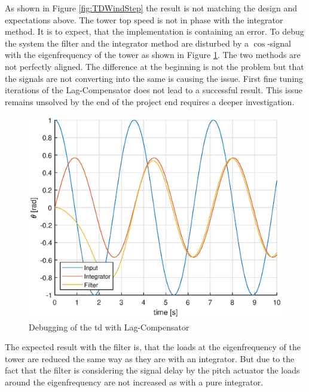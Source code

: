 As shown in Figure \ref{fig:TDWindStep} the result is not matching the design and expectations above. 
The tower top speed is not in phase with the integrator method. It is to expect, that the implementation is containing an error.
To debug the system the filter and the integrator method are disturbed by a $\cos$-signal with the eigenfrequency of the tower as shown in Figure \ref{fig:Debug}. 
The two methods are not perfectly aligned. 
The difference at the beginning is not the problem but that the signals are not converting into the same is causing the issue. 
First fine tuning iterations of the Lag-Compensator does not lead to a successful result. 
This issue remains unsolved by the end of the project end requires a deeper investigation. 
 
\begin{figure}[h]
	\centering	
	\includegraphics[width=12cm]{Figures/Debugging.eps}
	\caption{Debugging of the \gls{td} with Lag-Compensator}
	\label{fig:Debug}
\end{figure}
  
The expected result with the filter is, that the loads at the eigenfrequency of the tower are reduced the same way as they are with an integrator.
But due to the fact that the filter is considering the signal delay by the pitch actuator the loads around the eigenfrequency are not increased as with a pure integrator.    